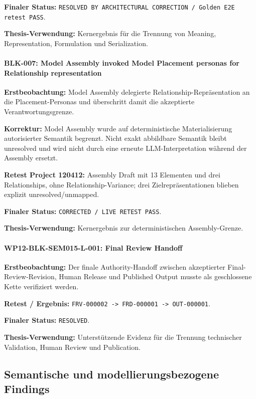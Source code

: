 \textbf{Finaler Status:}
\texttt{RESOLVED BY ARCHITECTURAL CORRECTION / Golden E2E retest PASS}.

\textbf{Thesis-Verwendung:}
Kernergebnis für die Trennung von Meaning, Representation, Formulation und
Serialization.


\paragraph{BLK-007: Model Assembly invoked Model Placement personas for Relationship representation}

\textbf{Erstbeobachtung:}
Model Assembly delegierte Relationship-Repräsentation an die Placement-Personas
und überschritt damit die akzeptierte Verantwortungsgrenze.

\textbf{Korrektur:}
Model Assembly wurde auf deterministische Materialisierung autorisierter Semantik
begrenzt. Nicht exakt abbildbare Semantik bleibt unresolved und wird nicht durch
eine erneute LLM-Interpretation während der Assembly ersetzt.

\textbf{Retest Project 120412:}
Assembly Draft mit 13 Elementen und drei Relationships, ohne Relationship-Variance;
drei Zielrepräsentationen blieben explizit unresolved/unmapped.

\textbf{Finaler Status:}
\texttt{CORRECTED / LIVE RETEST PASS}.

\textbf{Thesis-Verwendung:}
Kernergebnis zur deterministischen Assembly-Grenze.


\paragraph{WP12-BLK-SEM015-L-001: Final Review Handoff}

\textbf{Erstbeobachtung:}
Der finale Authority-Handoff zwischen akzeptierter Final-Review-Revision,
Human Release und Published Output musste als geschlossene Kette verifiziert werden.

\textbf{Retest / Ergebnis:}
\texttt{FRV-000002 -> FRD-000001 -> OUT-000001}.

\textbf{Finaler Status:}
\texttt{RESOLVED}.

\textbf{Thesis-Verwendung:}
Unterstützende Evidenz für die Trennung technischer Validation, Human Review und
Publication.


\subsection{Semantische und modellierungsbezogene Findings}

